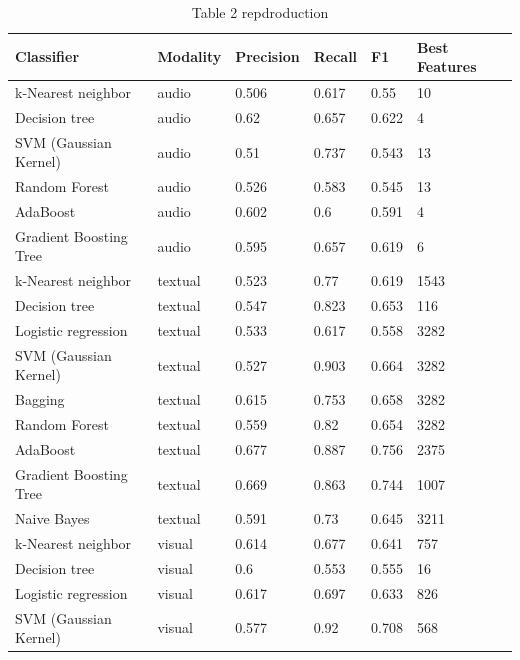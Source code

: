 \documentclass[sigconf]{acmart}
\begin{document}
\begin{table}[]
\caption*{Table 2 repdroduction}
\begin{tabular}{llllll}
\hline
Classifier             & Modality & Precision & Recall & F1    & Best Features \\ \hline
k-Nearest neighbor     & audio    & 0.506     & 0.617  & 0.55  & 10            \\
Decision tree          & audio    & 0.62      & 0.657  & 0.622 & 4             \\
SVM (Gaussian Kernel)  & audio    & 0.51      & 0.737  & 0.543 & 13            \\
Random Forest          & audio    & 0.526     & 0.583  & 0.545 & 13            \\
AdaBoost               & audio    & 0.602     & 0.6    & 0.591 & 4             \\
Gradient Boosting Tree & audio    & 0.595     & 0.657  & 0.619 & 6             \\
k-Nearest neighbor     & textual  & 0.523     & 0.77   & 0.619 & 1543          \\
Decision tree          & textual  & 0.547     & 0.823  & 0.653 & 116           \\
Logistic regression    & textual  & 0.533     & 0.617  & 0.558 & 3282          \\
SVM (Gaussian Kernel)  & textual  & 0.527     & 0.903  & 0.664 & 3282          \\
Bagging                & textual  & 0.615     & 0.753  & 0.658 & 3282          \\
Random Forest          & textual  & 0.559     & 0.82   & 0.654 & 3282          \\
AdaBoost               & textual  & 0.677     & 0.887  & 0.756 & 2375          \\
Gradient Boosting Tree & textual  & 0.669     & 0.863  & 0.744 & 1007          \\
Naive Bayes            & textual  & 0.591     & 0.73   & 0.645 & 3211          \\
k-Nearest neighbor     & visual   & 0.614     & 0.677  & 0.641 & 757           \\
Decision tree          & visual   & 0.6       & 0.553  & 0.555 & 16            \\
Logistic regression    & visual   & 0.617     & 0.697  & 0.633 & 826           \\
SVM (Gaussian Kernel)  & visual   & 0.577     & 0.92   & 0.708 & 568           \\

\end{tabular}
\end{table}
\end{document}
